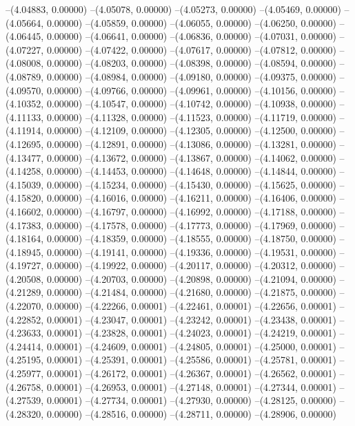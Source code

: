 --(4.04883, 0.00000)
--(4.05078, 0.00000)
--(4.05273, 0.00000)
--(4.05469, 0.00000)
--(4.05664, 0.00000)
--(4.05859, 0.00000)
--(4.06055, 0.00000)
--(4.06250, 0.00000)
--(4.06445, 0.00000)
--(4.06641, 0.00000)
--(4.06836, 0.00000)
--(4.07031, 0.00000)
--(4.07227, 0.00000)
--(4.07422, 0.00000)
--(4.07617, 0.00000)
--(4.07812, 0.00000)
--(4.08008, 0.00000)
--(4.08203, 0.00000)
--(4.08398, 0.00000)
--(4.08594, 0.00000)
--(4.08789, 0.00000)
--(4.08984, 0.00000)
--(4.09180, 0.00000)
--(4.09375, 0.00000)
--(4.09570, 0.00000)
--(4.09766, 0.00000)
--(4.09961, 0.00000)
--(4.10156, 0.00000)
--(4.10352, 0.00000)
--(4.10547, 0.00000)
--(4.10742, 0.00000)
--(4.10938, 0.00000)
--(4.11133, 0.00000)
--(4.11328, 0.00000)
--(4.11523, 0.00000)
--(4.11719, 0.00000)
--(4.11914, 0.00000)
--(4.12109, 0.00000)
--(4.12305, 0.00000)
--(4.12500, 0.00000)
--(4.12695, 0.00000)
--(4.12891, 0.00000)
--(4.13086, 0.00000)
--(4.13281, 0.00000)
--(4.13477, 0.00000)
--(4.13672, 0.00000)
--(4.13867, 0.00000)
--(4.14062, 0.00000)
--(4.14258, 0.00000)
--(4.14453, 0.00000)
--(4.14648, 0.00000)
--(4.14844, 0.00000)
--(4.15039, 0.00000)
--(4.15234, 0.00000)
--(4.15430, 0.00000)
--(4.15625, 0.00000)
--(4.15820, 0.00000)
--(4.16016, 0.00000)
--(4.16211, 0.00000)
--(4.16406, 0.00000)
--(4.16602, 0.00000)
--(4.16797, 0.00000)
--(4.16992, 0.00000)
--(4.17188, 0.00000)
--(4.17383, 0.00000)
--(4.17578, 0.00000)
--(4.17773, 0.00000)
--(4.17969, 0.00000)
--(4.18164, 0.00000)
--(4.18359, 0.00000)
--(4.18555, 0.00000)
--(4.18750, 0.00000)
--(4.18945, 0.00000)
--(4.19141, 0.00000)
--(4.19336, 0.00000)
--(4.19531, 0.00000)
--(4.19727, 0.00000)
--(4.19922, 0.00000)
--(4.20117, 0.00000)
--(4.20312, 0.00000)
--(4.20508, 0.00000)
--(4.20703, 0.00000)
--(4.20898, 0.00000)
--(4.21094, 0.00000)
--(4.21289, 0.00000)
--(4.21484, 0.00000)
--(4.21680, 0.00000)
--(4.21875, 0.00000)
--(4.22070, 0.00000)
--(4.22266, 0.00001)
--(4.22461, 0.00001)
--(4.22656, 0.00001)
--(4.22852, 0.00001)
--(4.23047, 0.00001)
--(4.23242, 0.00001)
--(4.23438, 0.00001)
--(4.23633, 0.00001)
--(4.23828, 0.00001)
--(4.24023, 0.00001)
--(4.24219, 0.00001)
--(4.24414, 0.00001)
--(4.24609, 0.00001)
--(4.24805, 0.00001)
--(4.25000, 0.00001)
--(4.25195, 0.00001)
--(4.25391, 0.00001)
--(4.25586, 0.00001)
--(4.25781, 0.00001)
--(4.25977, 0.00001)
--(4.26172, 0.00001)
--(4.26367, 0.00001)
--(4.26562, 0.00001)
--(4.26758, 0.00001)
--(4.26953, 0.00001)
--(4.27148, 0.00001)
--(4.27344, 0.00001)
--(4.27539, 0.00001)
--(4.27734, 0.00001)
--(4.27930, 0.00000)
--(4.28125, 0.00000)
--(4.28320, 0.00000)
--(4.28516, 0.00000)
--(4.28711, 0.00000)
--(4.28906, 0.00000)
